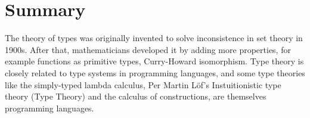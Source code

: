 












\section{Summary}


The theory of types was originally invented to solve inconsistence in set theory in 1900s. After that, mathematicians developed it by adding more properties, for example functions as primitive types, Curry-Howard isomorphism. Type theory is closely related to type systems in programming languages, and some type theories like the simply-typed lambda calculus, Per Martin L\"{o}f's Instuitionistic type theory (Type Theory) and the calculus of constructions, are themselves programming languages. 

